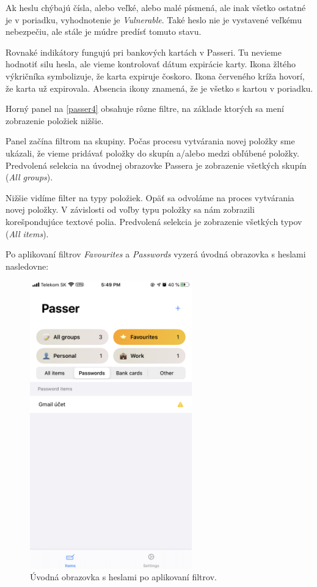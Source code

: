 Ak heslu chýbajú čísla, alebo veľké, alebo malé písmená, ale inak všetko ostatné je v poriadku, vyhodnotenie je \textit{Vulnerable}. Také heslo nie je vystavené veľkému nebezpečiu, ale stále je múdre predísť tomuto stavu.

Rovnaké indikátory fungujú pri bankových kartách v Passeri. Tu nevieme hodnotiť silu hesla, ale vieme kontrolovať dátum expirácie karty. Ikona žltého výkričníka symbolizuje, že karta expiruje čoskoro. Ikona červeného kríža hovorí, že karta už expirovala. Absencia ikony znamená, že je všetko s kartou v poriadku.

Horný panel na \figurename{ \ref{passer4}} obsahuje rôzne filtre, na základe ktorých sa mení zobrazenie položiek nižšie. 

Panel začína filtrom na skupiny. Počas procesu vytvárania novej položky sme ukázali, že vieme pridávať položky do skupín a/alebo medzi obľúbené položky. Predvolená selekcia na úvodnej obrazovke Passera je zobrazenie všetkých skupín (\textit{All groups}).

Nižšie vidíme filter na typy položiek. Opäť sa odvoláme na proces vytvárania novej položky. V závislosti od voľby typu položky sa nám zobrazili korešpondujúce textové polia. Predvolená selekcia je zobrazenie všetkých typov (\textit{All items}).

Po aplikovaní filtrov \textit{Favourites} a \textit{Passwords} vyzerá úvodná obrazovka s heslami nasledovne:

\begin{figure}[H]
  \centering
  \includegraphics[width=7cm]{img/passer5.PNG}
  \caption{Úvodná obrazovka s heslami po aplikovaní filtrov.}
  \label{passer5}
\end{figure}

